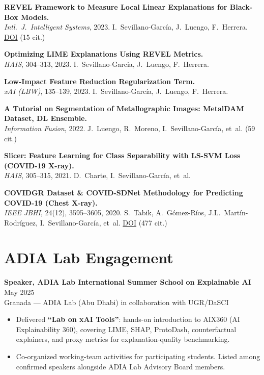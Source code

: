 \documentclass[10pt,a4paper]{article}
\begin{document}
\begin{minipage}[t]{0.64\textwidth}
\textbf{REVEL Framework to Measure Local Linear Explanations for Black-Box Models.} \\
\textcolor{subtle}{\textit{Intl.~J.~Intelligent Systems}, 2023. I.~Sevillano-García, J.~Luengo, F.~Herrera. \href{https://doi.org/10.1155/2023/8068569}{DOI} \quad (15 cit.)}

\textbf{Optimizing LIME Explanations Using REVEL Metrics.} \\
\textcolor{subtle}{\textit{HAIS}, 304--313, 2023. I.~Sevillano-Garcia, J.~Luengo, F.~Herrera.}

\textbf{Low-Impact Feature Reduction Regularization Term.} \\
\textcolor{subtle}{\textit{xAI (LBW)}, 135--139, 2023. I.~Sevillano-García, J.~Luengo, F.~Herrera.}

\textbf{A Tutorial on Segmentation of Metallographic Images: MetalDAM Dataset, DL Ensemble.} \\
\textcolor{subtle}{\textit{Information Fusion}, 2022. J.~Luengo, R.~Moreno, I.~Sevillano-García, et~al. \quad (59 cit.)}

\textbf{Slicer: Feature Learning for Class Separability with LS-SVM Loss (COVID-19 X-ray).} \\
\textcolor{subtle}{\textit{HAIS}, 305--315, 2021. D.~Charte, I.~Sevillano-García, et~al.}

\textbf{COVIDGR Dataset \& COVID-SDNet Methodology for Predicting COVID-19 (Chest X-ray).} \\
\textcolor{subtle}{\textit{IEEE JBHI}, 24(12), 3595--3605, 2020. S.~Tabik, A.~Gómez-Ríos, J.L.~Martín-Rodríguez, I.~Sevillano-García, et~al. \href{https://doi.org/10.1109/JBHI.2020.3037127}{DOI} \quad (477 cit.)}

\normalsize

\vspace{0.3em}

\section*{ADIA Lab Engagement}

\textbf{Speaker, ADIA Lab International Summer School on Explainable AI} \hfill May 2025 \\
\textcolor{subtle}{\footnotesize Granada --- ADIA Lab (Abu Dhabi) in collaboration with UGR/DaSCI}
\begin{itemize}
    \item Delivered \textbf{``Lab on xAI Tools''}: hands-on introduction to AIX360 (AI Explainability 360), covering LIME, SHAP, ProtoDash, counterfactual explainers, and proxy metrics for explanation-quality benchmarking.
    \item Co-organized working-team activities for participating students. Listed among confirmed speakers alongside ADIA Lab Advisory Board members.
\end{itemize}


\end{minipage}
\end{document}

